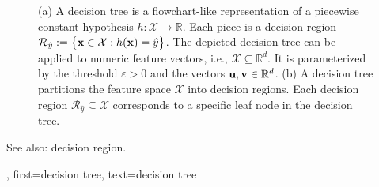 {{{\begin{figure}[H]
\begin{minipage}{.45\textwidth}
		\end{minipage}
		\caption{(a) A decision tree is a flowchart-like representation of a piecewise constant hypothesis $h: \mathcal{X} \rightarrow \mathbb{R}$.  
		Each piece is a decision region $\mathcal{R}_{\hat{y}} := \big\{ {\bf x} \in  \mathcal{X}: h({\bf x}) = \hat{y} \big\}$. 
		The depicted decision tree can be applied to numeric feature vectors, i.e., $\mathcal{X} \subseteq \mathbb{R}^{d}$. It is parameterized 
		by the threshold $\varepsilon>0$ and the vectors ${\bf u}, {\bf v} \in \mathbb{R}^{d}$. 
		(b) A decision tree partitions the feature space $\mathcal{X}$ into decision regions. Each decision region  
		$\mathcal{R}_{\hat{y}} \!\subseteq\!\mathcal{X}$ corresponds to a specific leaf node in the decision tree.}
		\label{fig_decision_tree_dict}
		\end{figure} 
		See also: decision region.},
	  first={decision tree},
	  text={decision tree} 
}


}

